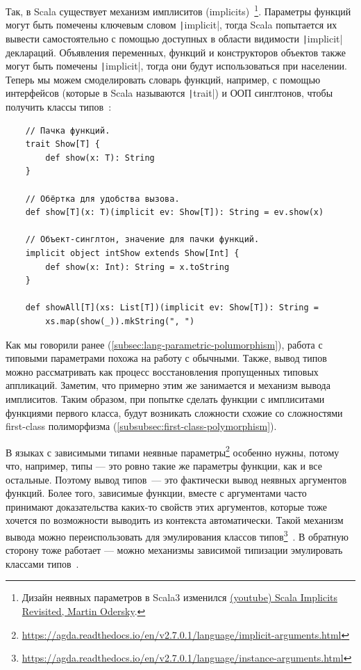 Так, в Scala существует механизм имплиситов (implicits)~\cite{kvrikava2019scala}\footnote{Дизайн неявных параметров в Scala3 изменился \href{https://youtu.be/dr0PUXQhg3M?si=pCydSikA_gnnCMrq}{(youtube) Scala Implicits Revisited, Martin Odersky}.}.
Параметры функций могут быть помечены ключевым словом \texttt|implicit|, тогда Scala попытается их вывести самостоятельно с помощью доступных в области видимости \texttt|implicit| деклараций.
Объявления переменных, функций и конструкторов объектов также могут быть помечены \texttt|implicit|, тогда они будут использоваться при населении.
Теперь мы можем смоделировать словарь функций, например, с помощью интерфейсов (которые в Scala называются \texttt|trait|) и ООП синглтонов, чтобы получить классы типов~\cite{oliveira2010type}:
\begin{verbatim}
    // Пачка функций.
    trait Show[T] {
        def show(x: T): String
    }

    // Обёртка для удобства вызова.
    def show[T](x: T)(implicit ev: Show[T]): String = ev.show(x)

    // Объект-синглтон, значение для пачки функций.
    implicit object intShow extends Show[Int] {
        def show(x: Int): String = x.toString
    }

    def showAll[T](xs: List[T])(implicit ev: Show[T]): String =
        xs.map(show(_)).mkString(", ")
\end{verbatim}

Как мы говорили ранее (\ref{subsec:lang-parametric-polumorphism}), работа с типовыми параметрами похожа на работу с обычными.
Также, вывод типов можно рассматривать как процесс восстановления пропущенных типовых аппликаций.
Заметим, что примерно этим же занимается и механизм вывода имплиситов.
Таким образом, при попытке сделать функции с имплиситами функциями первого класса, будут возникать сложности схожие со сложностями first-class полиморфизма (\ref{subsubsec:first-class-polymorphism}).

В языках с зависимыми типами неявные параметры\footnote{\url{https://agda.readthedocs.io/en/v2.7.0.1/language/implicit-arguments.html}} особенно нужны, потому что, например, типы --- это ровно такие же параметры функции, как и все остальные.
Поэтому вывод типов~--- это фактически вывод неявных аргументов функций.
Более того, зависимые функции, вместе с аргументами часто принимают доказательства каких-то свойств этих аргументов, которые тоже хочется по возможности выводить из контекста автоматически.
Такой механизм вывода можно переиспользовать для эмулирования классов типов\footnote{\url{https://agda.readthedocs.io/en/v2.7.0.1/language/instance-arguments.html}}~\cite{devriese2011bright}.
В обратную сторону тоже работает --- можно механизмы зависимой типизации эмулировать классами типов~\cite{mcbride2002faking}.

